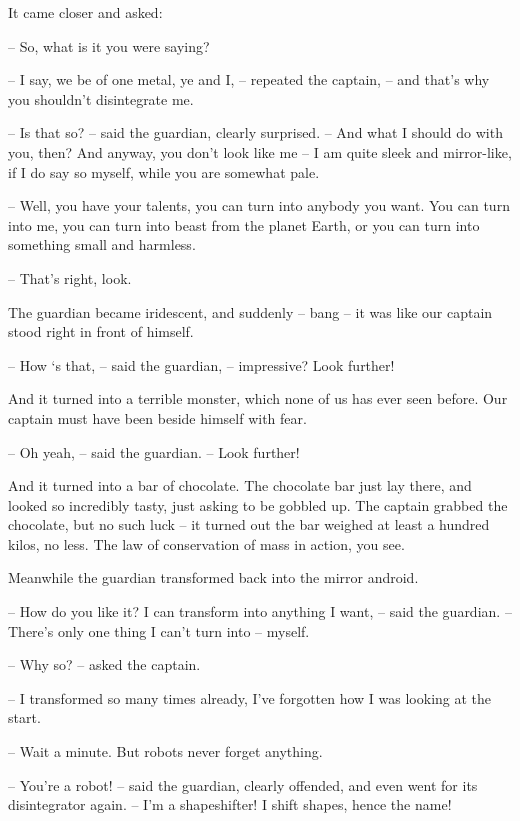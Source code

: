 \documentclass[ebook,twoside,final,openright]{memoir}
\begin{document}
\par
It came closer and asked:\par
– So, what is it you were saying?\par
– I say, we be of one metal, ye and I, – repeated the captain, – and that’s why you shouldn’t disintegrate me.\par
– Is that so? – said the guardian, clearly surprised. – And what I should do with you, then? And anyway, you don’t look like me – I am quite sleek and mirror-like, if I do say so myself, while you are somewhat pale.\par
– Well, you have your talents, you can turn into anybody you want. You can turn into me, you can turn into beast from the planet Earth, or you can turn into something small and harmless.\par
– That's right, look.\par
\par
The guardian became iridescent, and suddenly – bang – it was like our captain stood right in front of himself.\par
– How ‘s that, – said the guardian, – impressive? Look further!\par
And it turned into a terrible monster, which none of us has ever seen before. Our captain must have been beside himself with fear.\par
– Oh yeah, – said the guardian. – Look further!\par
\par
And it turned into a bar of chocolate. The chocolate bar just lay there, and looked so incredibly tasty, just asking to be gobbled up. The captain grabbed the chocolate, but no such luck – it turned out the bar weighed at least a hundred kilos, no less. The law of conservation of mass in action, you see.\par
\par
Meanwhile the guardian transformed back into the mirror android.\par
– How do you like it? I can transform into anything I want, – said the guardian. – There’s only one thing I can’t turn into – myself.\par
– Why so? – asked the captain.\par
– I transformed so many times already, I’ve forgotten how I was looking at the start.\par
– Wait a minute. But robots never forget anything.\par
– You’re a robot! – said the guardian, clearly offended, and even went for its disintegrator again. – I’m a shapeshifter! I shift shapes, hence the name!\par
\end{document}
